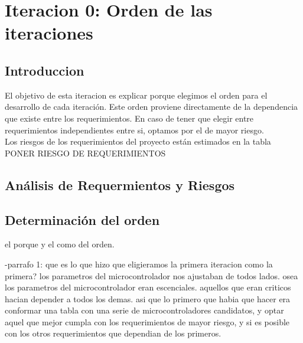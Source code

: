 \chapter{Iteracion 0: Orden de las iteraciones} %
\label{cha:iteracion_0}

\section{Introduccion} %
\label{it0:sec:introduccion}

El objetivo de esta iteracion es explicar porque elegimos el orden para el desarrollo de cada iteración. Este orden proviene directamente de la dependencia que existe entre los requerimientos. En caso de tener que elegir entre requerimientos independientes entre si, optamos por el de mayor riesgo. \\

Los riesgos de los requerimientos del proyecto están estimados en la tabla PONER RIESGO DE REQUERIMIENTOS



\section{Análisis de Requermientos y Riesgos} %
\label{it0:sec:analisis_de_requermientos_y_riesgos}





\section{Determinación del orden} %
\label{it0:sec:determinacion_del_orden}

el porque y el como del orden.

-parrafo 1:
que es lo que hizo que eligieramos la primera iteracion como la primera? los parametros del microcontrolador nos ajustaban de todos lados. osea los parametros del microcontrolador eran escenciales. aquellos que eran criticos hacian depender a todos los demas. asi que lo primero que habia que hacer era conformar una tabla con una serie de microcontroladores candidatos, y optar aquel que mejor cumpla con los requerimientos de mayor riesgo, y si es posible con los otros requerimientos que dependian de los primeros.


